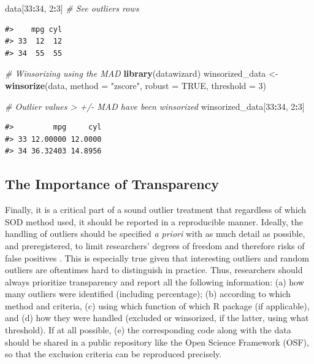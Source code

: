 \documentclass[sn-basic, lineno,pdflatex]{sn-jnl}
\newenvironment{Shaded}{\begin{snugshade}}{\end{snugshade}}
\newcommand{\AttributeTok}[1]{\textcolor[rgb]{0.13,0.29,0.53}{#1}}
\newcommand{\CommentTok}[1]{\textcolor[rgb]{0.56,0.35,0.01}{\textit{#1}}}
\newcommand{\ConstantTok}[1]{\textcolor[rgb]{0.56,0.35,0.01}{#1}}
\newcommand{\DecValTok}[1]{\textcolor[rgb]{0.00,0.00,0.81}{#1}}
\newcommand{\FunctionTok}[1]{\textcolor[rgb]{0.13,0.29,0.53}{\textbf{#1}}}
\newcommand{\NormalTok}[1]{#1}
\newcommand{\OtherTok}[1]{\textcolor[rgb]{0.56,0.35,0.01}{#1}}
\newcommand{\SpecialCharTok}[1]{\textcolor[rgb]{0.81,0.36,0.00}{\textbf{#1}}}
\newcommand{\StringTok}[1]{\textcolor[rgb]{0.31,0.60,0.02}{#1}}
\begin{document}
\begin{Shaded}
\begin{Highlighting}[]
\NormalTok{data[}\DecValTok{33}\SpecialCharTok{:}\DecValTok{34}\NormalTok{, }\DecValTok{2}\SpecialCharTok{:}\DecValTok{3}\NormalTok{] }\CommentTok{\# See outliers rows}
\end{Highlighting}
\end{Shaded}

\begin{verbatim}
#>    mpg cyl
#> 33  12  12
#> 34  55  55
\end{verbatim}

\begin{Shaded}
\begin{Highlighting}[]
\CommentTok{\# Winsorizing using the MAD}
\FunctionTok{library}\NormalTok{(datawizard)}
\NormalTok{winsorized\_data }\OtherTok{\textless{}{-}} \FunctionTok{winsorize}\NormalTok{(data, }\AttributeTok{method =} \StringTok{"zscore"}\NormalTok{, }
                             \AttributeTok{robust =} \ConstantTok{TRUE}\NormalTok{, }\AttributeTok{threshold =} \DecValTok{3}\NormalTok{)}

\CommentTok{\# Outlier values \textgreater{} +/{-} MAD have been winsorized}
\NormalTok{winsorized\_data[}\DecValTok{33}\SpecialCharTok{:}\DecValTok{34}\NormalTok{, }\DecValTok{2}\SpecialCharTok{:}\DecValTok{3}\NormalTok{]}
\end{Highlighting}
\end{Shaded}

\begin{verbatim}
#>         mpg     cyl
#> 33 12.00000 12.0000
#> 34 36.32403 14.8956
\end{verbatim}

\subsection{The Importance of
Transparency}\label{the-importance-of-transparency}

Finally, it is a critical part of a sound outlier treatment that
regardless of which SOD method used, it should be reported in a
reproducible manner. Ideally, the handling of outliers should be
specified \emph{a priori} with as much detail as possible, and
preregistered, to limit researchers' degrees of freedom and therefore
risks of false positives \citep{leys2019outliers}. This is especially
true given that interesting outliers and random outliers are oftentimes
hard to distinguish in practice. Thus, researchers should always
prioritize transparency and report all the following information: (a)
how many outliers were identified (including percentage); (b) according
to which method and criteria, (c) using which function of which R
package (if applicable), and (d) how they were handled (excluded or
winsorized, if the latter, using what threshold). If at all possible,
(e) the corresponding code along with the data should be shared in a
public repository like the Open Science Framework (OSF), so that the
exclusion criteria can be reproduced precisely.
\end{document}
